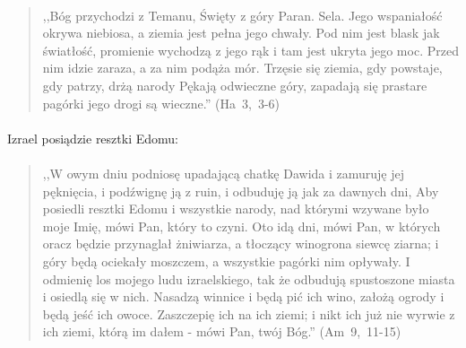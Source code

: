 \documentclass[10pt,a4paper,oneside]{article}
\begin{document}
\paragraph{}
\begin{quote}
,,Bóg przychodzi z Temanu, Święty z góry Paran. Sela. Jego wspaniałość okrywa niebiosa, a ziemia jest pełna jego chwały. Pod nim jest blask jak światłość, promienie wychodzą z jego rąk i tam jest ukryta jego moc. Przed nim idzie zaraza, a za nim podąża mór. Trzęsie się ziemia, gdy powstaje, gdy patrzy, drżą narody Pękają odwieczne góry, zapadają się prastare pagórki jego drogi są wieczne.'' \mbox{(Ha 3, 3-6)}
\end{quote}
\paragraph{}
Izrael posiądzie resztki Edomu:
\paragraph{}
\begin{quote}
,,W owym dniu podniosę upadającą chatkę Dawida i zamuruję jej pęknięcia, i podźwignę ją z ruin, i odbuduję ją jak za dawnych dni, Aby posiedli resztki Edomu i wszystkie narody, nad którymi wzywane było moje Imię, mówi Pan, który to czyni. Oto idą dni, mówi Pan, w których oracz będzie przynaglał żniwiarza, a tłoczący winogrona siewcę ziarna; i góry będą ociekały moszczem, a wszystkie pagórki nim opływały. I odmienię los mojego ludu izraelskiego, tak że odbudują spustoszone miasta i osiedlą się w nich. Nasadzą winnice i będą pić ich wino, założą ogrody i będą jeść ich owoce. Zaszczepię ich na ich ziemi; i nikt ich już nie wyrwie z ich ziemi, którą im dałem - mówi Pan, twój Bóg.'' \mbox{(Am 9, 11-15)}
\end{quote}
\end{document}
